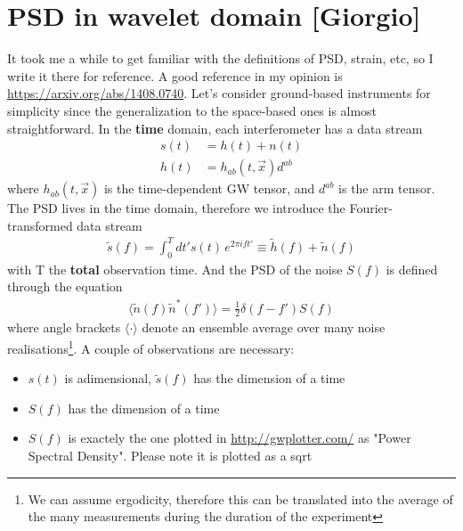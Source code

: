 \documentclass{article}
\begin{document}
\section{PSD in wavelet domain [Giorgio]}
It took me a while to get familiar with the definitions of PSD, strain, etc, so I write it there for reference. A good reference in my opinion is \url{https://arxiv.org/abs/1408.0740}.
Let's consider ground-based instruments for simplicity since the generalization to the space-based ones is almost straightforward. In the \textbf{time} domain, each interferometer has a data stream
\begin{align}
s(t)&=h(t)+n(t)\nonumber\\
h(t)&=h_{ab}(t,\vec x)d^{ab}
\end{align}
where $h_{ab}(t,\vec x)$ is the time-dependent GW tensor, and $d^{ab}$ is the arm tensor.
The PSD lives in the time domain, therefore we introduce the Fourier-transformed data stream
\begin{align}
\tilde s(f)=\int_0^Tdt' s(t)\,e^{2\pi i f t'}\equiv \tilde h(f)+\tilde n(f)
\end{align}
with T the \textbf{total} observation time. And the PSD of the noise $S(f)$ is defined through the equation
\begin{align}\label{PSD_def_cont}
\langle \tilde n(f)\tilde n^*(f')\rangle=\frac 1 2 \delta(f-f')S(f)
\end{align}
where angle brackets $\langle\cdot\rangle$ denote an ensemble average over many noise realisations\footnote{We can assume ergodicity, therefore this can be translated into the average of the many measurements during the duration of the experiment}. A couple of observations are necessary:
\begin{itemize}
    \item $s(t)$ is adimensional, $\tilde s(f)$ has the dimension of a time
    \item $S(f)$ has the dimension of a time
    \item $S(f)$ is exactely the one plotted in \url{http://gwplotter.com/} as "Power Spectral Density". Please note it is plotted as a sqrt
\end{itemize}
\end{document}
